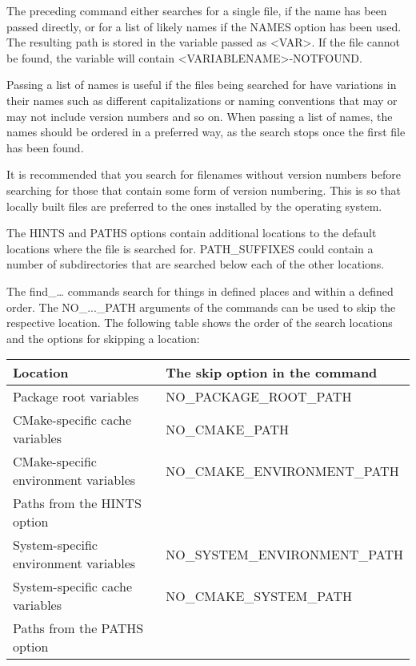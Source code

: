 The preceding command either searches for a single file, if the name has been passed directly, or for a list of likely names if the NAMES option has been used. The resulting path is stored in the variable passed as <VAR>. If the file cannot be found, the variable will contain <VARIABLENAME>-NOTFOUND.

Passing a list of names is useful if the files being searched for have variations in their names such as different capitalizations or naming conventions that may or may not include version numbers and so on. When passing a list of names, the names should be ordered in a preferred way, as the search stops once the first file has been found.

\begin{tcolorbox}[colback=blue!5!white,colframe=blue!75!black,title=Searching for Files Containing Version Numbers]
It is recommended that you search for filenames without version numbers before searching for those that contain some form of version numbering. This is so that locally built files are preferred to the ones installed by the operating system.
\end{tcolorbox}

The HINTS and PATHS options contain additional locations to the default locations where the file is searched for. PATH\_SUFFIXES could contain a number of subdirectories that are searched below each of the other locations.

The find\_… commands search for things in defined places and within a defined order. The NO\_...\_PATH arguments of the commands can be used to skip the respective location. The following table shows the order of the search locations and the options for skipping a location:

\begin{table}[H]
	\centering
	\begin{tabular}{|l|l|}
		\hline
		\textbf{Location}                     & \textbf{The skip option in the command} \\ \hline
		Package root variables                & NO\_PACKAGE\_ROOT\_PATH                 \\ \hline
		CMake-specific cache variables        & NO\_CMAKE\_PATH                         \\ \hline
		CMake-specific environment variables  & NO\_CMAKE\_ENVIRONMENT\_PATH            \\ \hline
		Paths from the HINTS option           &                                         \\ \hline
		System-specific environment variables & NO\_SYSTEM\_ENVIRONMENT\_PATH           \\ \hline
		System-specific cache variables       & NO\_CMAKE\_SYSTEM\_PATH                 \\ \hline
		Paths from the PATHS option           &                                         \\ \hline
	\end{tabular}
\end{table}

